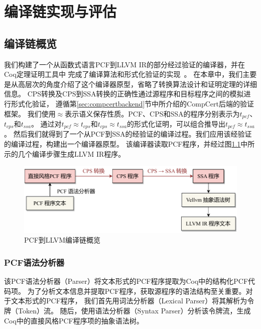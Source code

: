 
\chapter{编译链实现与评估} \label{ch:implement}

\section{编译链概览} \label{sec:overview}

我们构建了一个从函数式语言PCF到LLVM IR的部分经过验证的编译器，并在Coq定理证明工具中
完成了编译算法和形式化验证的实现~\cite{chlipala2022certified}。
在本章中，我们主要是从高层次的角度介绍了这个编译器原型，省略了转换算法设计和证明定理的详细信息。
CPS转换及CPS到SSA转换的正确性通过源程序和目标程序之间的模拟进行形式化验证，
遵循第\ref{sec:compcertbackend}节中所介绍的CompCert后端的验证框架。
我们使用$\approx $表示语义保存性质。PCF、CPS和SSA的程序分别表示为$t_{pcf}$、$t_{cps}$和$t_{ssa}$。
通过对$t_{pcf}\approx t_{cps}$和$t_{cps}\approx t_{ssa}$的形式化证明，可以组合推导出$t_{pcf}\approx t_{ssa}$。
然后我们就得到了一个从PCF到SSA的经验证的编译过程。我们应用该经验证的编译过程，构建出一个编译器原型。
该编译器读取PCF程序，并经过图\ref{overview}中所示的几个编译步骤生成LLVM IR程序。

\begin{figure}[htbp]
    \centering
    \includegraphics[width=0.8\linewidth]{figures/overview.pdf}
    \caption{PCF到LLVM编译链概览}\label{overview}
\end{figure}

\subsection{PCF语法分析器}

该PCF语法分析器（Parser）将文本形式的PCF程序提取为Coq中的结构化PCF代码项。
为了分析文本信息并提取PCF程序，获取源程序的语法结构至关重要。对于文本形式的PCF程序，
我们首先用词法分析器（Lexical Parser）将其解析为令牌（Token）流。
随后，使用语法分析器（Syntax Parser）分析该令牌流，生成Coq中的直接风格PCF程序项的抽象语法树。

